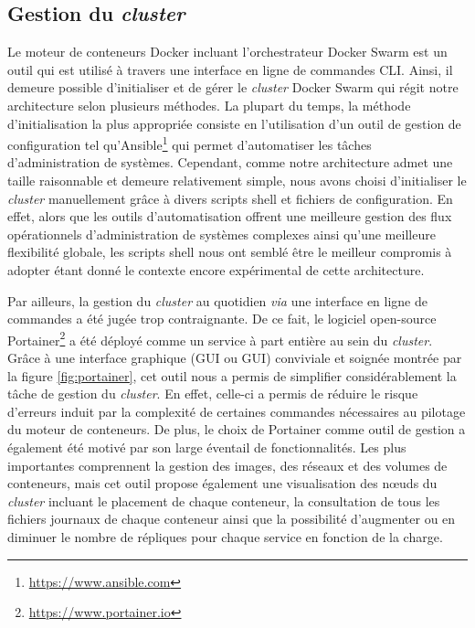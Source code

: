 \subsection{Gestion du \textit{cluster}}

Le moteur de conteneurs Docker incluant l'orchestrateur Docker Swarm est un outil qui est utilisé à travers une interface en ligne de commandes \acs{CLI}. Ainsi, il demeure possible d'initialiser et de gérer le \textit{cluster} Docker Swarm qui régit notre architecture selon plusieurs méthodes. La plupart du temps, la méthode d'initialisation la plus appropriée consiste en l'utilisation d'un outil de gestion de configuration tel qu'Ansible\footnote{\url{https://www.ansible.com}} qui permet d'automatiser les tâches d'administration de systèmes. Cependant, comme notre architecture admet une taille raisonnable et demeure relativement simple, nous avons choisi d'initialiser le \textit{cluster} manuellement grâce à divers scripts shell et fichiers de configuration. En effet, alors que les outils d'automatisation offrent une meilleure gestion des flux opérationnels d'administration de systèmes complexes ainsi qu'une meilleure flexibilité globale, les scripts shell nous ont semblé être le meilleur compromis à adopter étant donné le contexte encore expérimental de cette architecture.

Par ailleurs, la gestion du \textit{cluster} au quotidien \textit{via} une interface en ligne de commandes a été jugée trop contraignante. De ce fait, le logiciel open-source Portainer\footnote{\url{https://www.portainer.io}} a été déployé comme un service à part entière au sein du \textit{cluster}. Grâce à une interface graphique (\acl{GUI} ou \acs{GUI}) conviviale et soignée montrée par la figure \ref{fig:portainer}, cet outil nous a permis de simplifier considérablement la tâche de gestion du \textit{cluster}. En effet, celle-ci a permis de réduire le risque d'erreurs induit par la complexité de certaines commandes nécessaires au pilotage du moteur de conteneurs. De plus, le choix de Portainer comme outil de gestion a également été motivé par son large éventail de fonctionnalités. Les plus importantes comprennent la gestion des images, des réseaux et des volumes de conteneurs, mais cet outil propose également une visualisation des n\oe{}uds du \textit{cluster} incluant le placement de chaque conteneur, la consultation de tous les fichiers journaux de chaque conteneur ainsi que la possibilité d'augmenter ou en diminuer le nombre de répliques pour chaque service en fonction de la charge.

